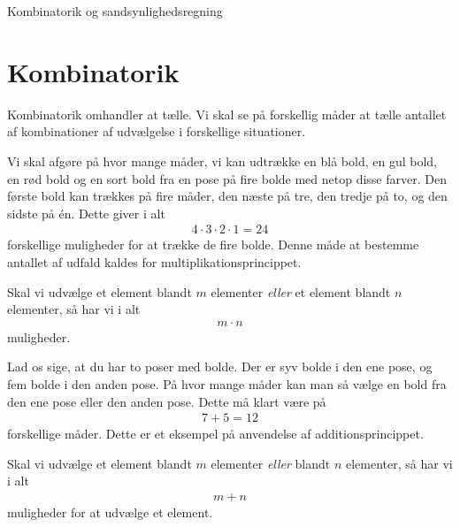 \begin{center}
\Huge
Kombinatorik og sandsynlighedsregning
\end{center}

\section*{Kombinatorik}
Kombinatorik omhandler at tælle. Vi skal se på forskellig måder at tælle antallet af kombinationer af udvælgelse i forskellige situationer.

\begin{exa}
Vi skal afgøre på hvor mange måder, vi kan udtrække en blå bold, en gul bold, en rød bold og en sort bold fra en pose på fire bolde med netop disse farver. Den første bold kan trækkes på fire måder, den næste på tre, den tredje på to, og den sidste på én. Dette giver i alt
\begin{align*}
4\cdot 3\cdot 2\cdot 1 = 24
\end{align*}
forskellige muligheder for at trække de fire bolde. Denne måde at bestemme antallet af udfald kaldes for multiplikationsprincippet.
\end{exa}

\begin{defn}[Multiplikationsprincippet]
Skal vi udvælge et element blandt $m$ elementer \textit{eller} et element blandt $n$ elementer, så har vi i alt
\begin{align*}
m\cdot n
\end{align*}
muligheder.
\end{defn}

\begin{exa}
Lad os sige, at du har to poser med bolde. Der er syv bolde i den ene pose, og fem bolde i den anden pose. På hvor mange måder kan man så vælge en bold fra den ene pose eller den anden pose. Dette må klart være på
\begin{align*}
7+5 = 12
\end{align*}
forskellige måder. Dette er et eksempel på anvendelse af additionsprincippet. 
\end{exa}
\begin{defn}[Additionsprincippet]
Skal vi udvælge et element blandt $m$ elementer \textit{eller} blandt $n$ elementer, så har vi i alt 
\begin{align*}
m+n
\end{align*}
muligheder for at udvælge et element. 
\end{defn}

